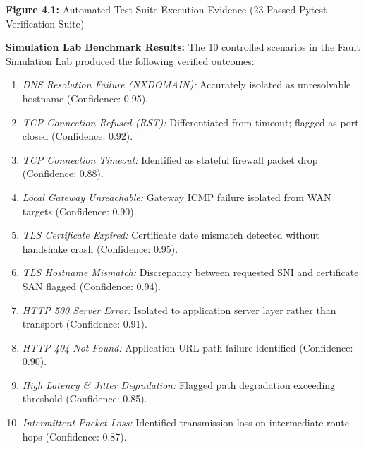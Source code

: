 \documentclass[
]{article}
\providecommand{\tightlist}{%
  \setlength{\itemsep}{0pt}\setlength{\parskip}{0pt}}
\begin{document}
\vspace{0.4cm}

\begin{center}
\end{center}

\vspace{0.2cm}
\begin{center}
\textbf{Figure 4.1:} Automated Test Suite Execution Evidence (23 Passed Pytest Verification Suite)
\end{center}

\vspace{0.3cm}
\textbf{Simulation Lab Benchmark Results:}
The 10 controlled scenarios in the Fault Simulation Lab produced the following verified outcomes:
\begin{enumerate}
\tightlist
\item \textit{DNS Resolution Failure (NXDOMAIN):} Accurately isolated as unresolvable hostname (Confidence: 0.95).
\item \textit{TCP Connection Refused (RST):} Differentiated from timeout; flagged as port closed (Confidence: 0.92).
\item \textit{TCP Connection Timeout:} Identified as stateful firewall packet drop (Confidence: 0.88).
\item \textit{Local Gateway Unreachable:} Gateway ICMP failure isolated from WAN targets (Confidence: 0.90).
\item \textit{TLS Certificate Expired:} Certificate date mismatch detected without handshake crash (Confidence: 0.95).
\item \textit{TLS Hostname Mismatch:} Discrepancy between requested SNI and certificate SAN flagged (Confidence: 0.94).
\item \textit{HTTP 500 Server Error:} Isolated to application server layer rather than transport (Confidence: 0.91).
\item \textit{HTTP 404 Not Found:} Application URL path failure identified (Confidence: 0.90).
\item \textit{High Latency & Jitter Degradation:} Flagged path degradation exceeding threshold (Confidence: 0.85).
\item \textit{Intermittent Packet Loss:} Identified transmission loss on intermediate route hops (Confidence: 0.87).
\end{enumerate}
\end{document}
